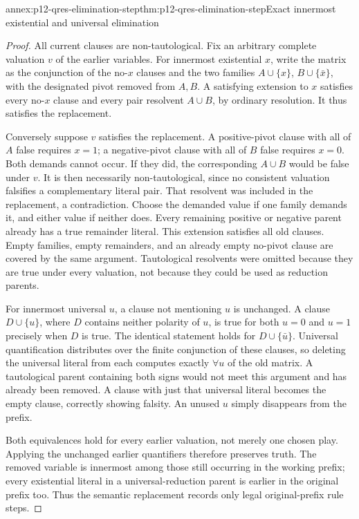 \begin{annexitem}{annex:p12-qres-elimination-step}{thm:p12-qres-elimination-step}{Exact innermost existential and universal elimination}
\begin{proof}
All current clauses are non-tautological.  Fix an arbitrary complete valuation
\(v\) of the earlier variables.  For innermost existential \(x\), write
the matrix as the conjunction of the no-\(x\) clauses and the two families
\(A\cup\{x\}\), \(B\cup\{\bar x\}\), with the designated pivot
removed from \(A,B\).  A satisfying extension to \(x\) satisfies every
no-\(x\) clause and every pair resolvent \(A\cup B\), by ordinary
resolution.  It thus satisfies the replacement.

Conversely suppose \(v\) satisfies the replacement.  A positive-pivot
clause with all of \(A\) false requires \(x=1\); a negative-pivot clause
with all of \(B\) false requires \(x=0\).  Both demands cannot occur.
If they did, the corresponding \(A\cup B\) would be false under \(v\).
It is then necessarily non-tautological, since no consistent valuation
falsifies a complementary literal pair.  That resolvent was included in
the replacement, a contradiction.  Choose the demanded value if one family
demands it, and either value if neither does.  Every remaining positive
or negative parent already has a true remainder literal.  This extension
satisfies all old clauses.  Empty families, empty remainders, and an already
empty no-pivot clause are covered by the same argument.  Tautological
resolvents were omitted because they are true under every valuation, not
because they could be used as reduction parents.

For innermost universal \(u\), a clause not mentioning \(u\) is unchanged.
A clause \(D\cup\{u\}\), where \(D\) contains neither polarity of
\(u\), is true for both \(u=0\) and \(u=1\) precisely when \(D\)
is true.  The identical statement holds for \(D\cup\{\bar u\}\).
Universal quantification distributes over the finite conjunction of these
clauses, so deleting the universal literal from each computes exactly
\(\forall u\) of the old matrix.  A tautological parent containing both
signs would not meet this argument and has already been removed.  A clause
with just that universal literal becomes the empty clause, correctly
showing falsity.  An unused \(u\) simply disappears from the prefix.

Both equivalences hold for every earlier valuation, not merely one chosen
play.  Applying the unchanged earlier quantifiers therefore preserves truth.
The removed variable is innermost among those still occurring in the
working prefix; every existential literal in a universal-reduction parent
is earlier in the original prefix too.  Thus the semantic replacement
records only legal original-prefix rule steps.
\end{proof}
\end{annexitem}


